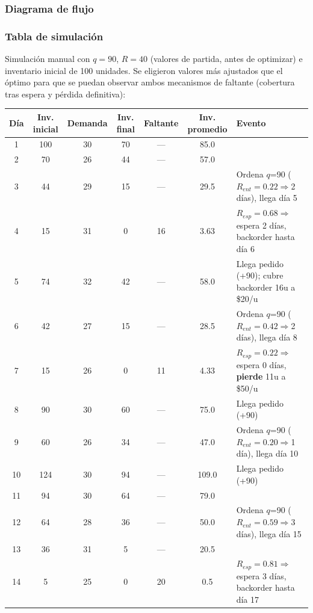 \subsubsection{Diagrama de flujo}


\subsubsection{Tabla de simulación}

Simulación manual con $q=90$, $R=40$ (valores de partida, antes de optimizar) e inventario inicial de 100 unidades. Se eligieron valores más ajustados que el óptimo para que se puedan observar ambos mecanismos de faltante (cobertura tras espera y pérdida definitiva):

\begin{center}
\small
\begin{tabular}{ccccccl}
\toprule
Día & Inv. inicial & Demanda & Inv. final & Faltante & Inv. promedio & Evento \\
\midrule
1  & 100 & 30 & 70  & --- & 85.0  & \\
2  & 70  & 26 & 44  & --- & 57.0  & \\
3  & 44  & 29 & 15  & --- & 29.5  & Ordena $q$=90 ($R_{ent}=0.22\Rightarrow$2 días), llega día 5 \\
4  & 15  & 31 & 0   & 16  & 3.63  & $R_{esp}=0.68\Rightarrow$espera 2 días, backorder hasta día 6 \\
5  & 74  & 32 & 42  & --- & 58.0  & Llega pedido (+90); cubre backorder 16u a \$20/u \\
6  & 42  & 27 & 15  & --- & 28.5  & Ordena $q$=90 ($R_{ent}=0.42\Rightarrow$2 días), llega día 8 \\
7  & 15  & 26 & 0   & 11  & 4.33  & $R_{esp}=0.22\Rightarrow$espera 0 días, \textbf{pierde} 11u a \$50/u \\
8  & 90  & 30 & 60  & --- & 75.0  & Llega pedido (+90) \\
9  & 60  & 26 & 34  & --- & 47.0  & Ordena $q$=90 ($R_{ent}=0.20\Rightarrow$1 día), llega día 10 \\
10 & 124 & 30 & 94  & --- & 109.0 & Llega pedido (+90) \\
11 & 94  & 30 & 64  & --- & 79.0  & \\
12 & 64  & 28 & 36  & --- & 50.0  & Ordena $q$=90 ($R_{ent}=0.59\Rightarrow$3 días), llega día 15 \\
13 & 36  & 31 & 5   & --- & 20.5  & \\
14 & 5   & 25 & 0   & 20  & 0.5   & $R_{esp}=0.81\Rightarrow$espera 3 días, backorder hasta día 17 \\

\end{tabular}
\end{center}
